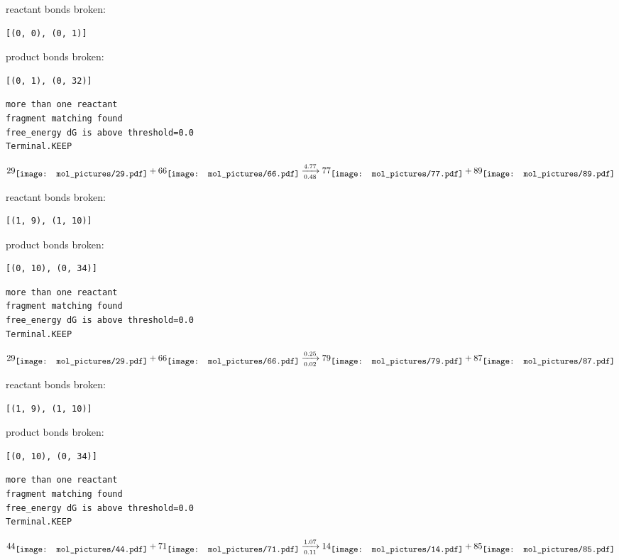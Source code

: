 \documentclass{article}
\begin{document}
reactant bonds broken:\begin{verbatim}
[(0, 0), (0, 1)]
\end{verbatim}
product bonds broken:\begin{verbatim}
[(0, 1), (0, 32)]
\end{verbatim}




\vspace{1cm}
\begin{verbatim}
more than one reactant
fragment matching found
free_energy dG is above threshold=0.0
Terminal.KEEP
\end{verbatim}
$$
29
\raisebox{-.5\height}{\texttt{[image: mol\_pictures/29.pdf]}}
+
66
\raisebox{-.5\height}{\texttt{[image: mol\_pictures/66.pdf]}}
\xrightarrow[0.48]{4.77}
77
\raisebox{-.5\height}{\texttt{[image: mol\_pictures/77.pdf]}}
+
89
\raisebox{-.5\height}{\texttt{[image: mol\_pictures/89.pdf]}}
$$


reactant bonds broken:\begin{verbatim}
[(1, 9), (1, 10)]
\end{verbatim}
product bonds broken:\begin{verbatim}
[(0, 10), (0, 34)]
\end{verbatim}




\vspace{1cm}
\begin{verbatim}
more than one reactant
fragment matching found
free_energy dG is above threshold=0.0
Terminal.KEEP
\end{verbatim}
$$
29
\raisebox{-.5\height}{\texttt{[image: mol\_pictures/29.pdf]}}
+
66
\raisebox{-.5\height}{\texttt{[image: mol\_pictures/66.pdf]}}
\xrightarrow[0.02]{0.25}
79
\raisebox{-.5\height}{\texttt{[image: mol\_pictures/79.pdf]}}
+
87
\raisebox{-.5\height}{\texttt{[image: mol\_pictures/87.pdf]}}
$$


reactant bonds broken:\begin{verbatim}
[(1, 9), (1, 10)]
\end{verbatim}
product bonds broken:\begin{verbatim}
[(0, 10), (0, 34)]
\end{verbatim}




\vspace{1cm}
\begin{verbatim}
more than one reactant
fragment matching found
free_energy dG is above threshold=0.0
Terminal.KEEP
\end{verbatim}
$$
44
\raisebox{-.5\height}{\texttt{[image: mol\_pictures/44.pdf]}}
+
71
\raisebox{-.5\height}{\texttt{[image: mol\_pictures/71.pdf]}}
\xrightarrow[0.11]{1.07}
14
\raisebox{-.5\height}{\texttt{[image: mol\_pictures/14.pdf]}}
+
85
\raisebox{-.5\height}{\texttt{[image: mol\_pictures/85.pdf]}}
$$
\end{document}
